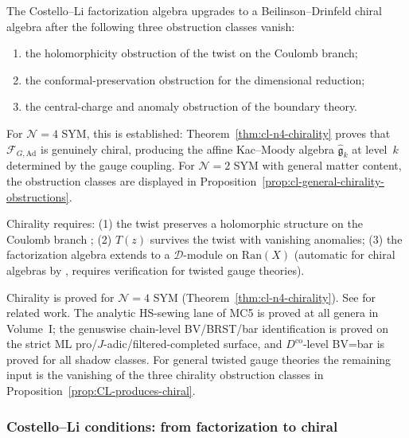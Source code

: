 \begin{proposition}\label{prop:CL-produces-chiral}
The Costello--Li factorization algebra upgrades to a Beilinson--Drinfeld
chiral algebra after the following three obstruction classes vanish:
\begin{enumerate}
\item the holomorphicity obstruction of the twist on the Coulomb branch;
\item the conformal-preservation obstruction for the dimensional reduction;
\item the central-charge and anomaly obstruction of the boundary theory.
\end{enumerate}

For $\mathcal{N}=4$ SYM, this is established:
Theorem~\ref{thm:cl-n4-chirality} proves that
$\mathcal{F}_{G,\mathrm{Ad}}$ is genuinely chiral, producing the
affine Kac--Moody algebra $\widehat{\mathfrak{g}}_k$ at level~$k$
determined by the gauge coupling. For $\mathcal{N}=2$ SYM with
general matter content, the obstruction classes are displayed in
Proposition~\ref{prop:cl-general-chirality-obstructions}.
\end{proposition}

\begin{remark}
Chirality requires: (1) the twist preserves a holomorphic structure on the Coulomb branch \cite{Gai19}; (2) $T(z)$ survives the twist with vanishing anomalies; (3) the factorization algebra extends to a $\mathcal{D}$-module on $\mathrm{Ran}(X)$ (automatic for chiral algebras by , requires verification for twisted gauge theories).
\end{remark}

\begin{remark}
Chirality is proved for $\mathcal{N}=4$ SYM (Theorem~\ref{thm:cl-n4-chirality}). See \cite{CDG20,GKW25,Zeng23} for related work. The analytic HS-sewing lane of MC5 is proved at all genera in Volume~I; the genuswise chain-level BV/BRST/bar identification is proved on the strict ML pro/$J$-adic/filtered-completed surface, and $D^{\mathrm{co}}$-level BV=bar is proved for all shadow classes. For general twisted gauge theories the remaining input is the vanishing of the three chirality obstruction classes in Proposition~\ref{prop:CL-produces-chiral}.
\end{remark}

\subsubsection{Costello--Li conditions: from factorization to chiral}

